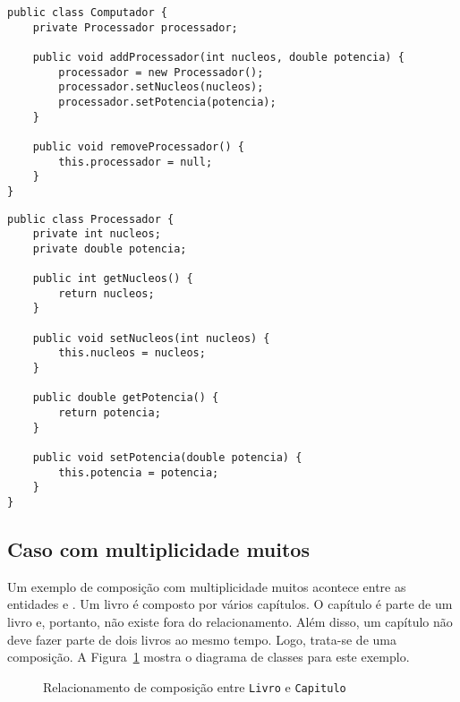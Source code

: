 \begin{verbatim}
public class Computador {
	private Processador processador;

	public void addProcessador(int nucleos, double potencia) {
		processador = new Processador();
		processador.setNucleos(nucleos);
		processador.setPotencia(potencia);
	}
	
	public void removeProcessador() {
		this.processador = null;
	}
}
\end{verbatim}
 
\begin{verbatim}
public class Processador {
	private int nucleos;
	private double potencia;
	
	public int getNucleos() {
		return nucleos;
	}

	public void setNucleos(int nucleos) {
		this.nucleos = nucleos;
	}

	public double getPotencia() {
		return potencia;
	}
	
	public void setPotencia(double potencia) {
		this.potencia = potencia;
	}
}
\end{verbatim}

\subsection{Caso com multiplicidade muitos}

Um exemplo de composição com multiplicidade muitos acontece entre as entidades  e . Um livro é composto por vários capítulos. O capítulo é parte de um livro e, portanto, não existe fora do relacionamento. Além disso, um capítulo não deve fazer parte de dois livros ao mesmo tempo. Logo, trata-se de uma composição. A Figura~\ref{fig:composicao-livro-capitulo} mostra o diagrama de classes para este exemplo.

\begin{figure}[h]
	\centering
	
	
	\caption{Relacionamento de composição entre \texttt{Livro} e \texttt{Capitulo}}
	\label{fig:composicao-livro-capitulo}
\end{figure}

